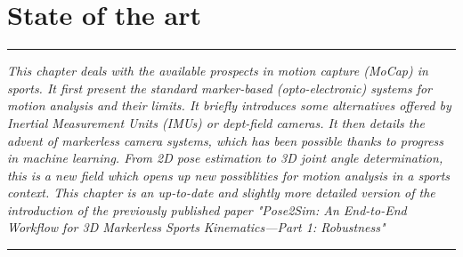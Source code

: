 
\lhead[\fancyplain{}{\leftmark}]%
      {\fancyplain{}{}} %
\chead[\fancyplain{}{}]%
      {\fancyplain{}{}}
\rhead[\fancyplain{}{}]%
      {\fancyplain{}{\rightmark}}%
\lfoot[\fancyplain{}{}]%
      {\fancyplain{}{}}
\cfoot[\fancyplain{}{\thepage}]%
      {\fancyplain{}{\thepage}} %
\rfoot[\fancyplain{}{}]%
     {\fancyplain{}{\scriptsize}}



\chapter{State of the art}
\label{ch:1}


\begin{center}
\rule{0.7\linewidth}{.5pt}
\begin{minipage}{0.7\linewidth}
\smallskip

\textit{This chapter deals with the available prospects in motion capture (MoCap) in sports. It first present the standard marker-based (opto-electronic) systems for motion analysis and their limits. It briefly introduces some alternatives offered by Inertial Measurement Units (IMUs) or dept-field cameras. It then details the advent of markerless camera systems, which has been possible thanks to progress in machine learning. From 2D pose estimation to 3D joint angle determination, this is a new field which opens up new possiblities for motion analysis in a sports context. \newline \newline
This chapter is an up-to-date and slightly more detailed version of the introduction of the previously published paper "Pose2Sim: An End-to-End Workflow for 3D Markerless Sports Kinematics—Part 1: Robustness" \cite{Pagnon2021} }

\end{minipage}
\smallskip
\rule{0.7\linewidth}{.5pt}
\end{center}

